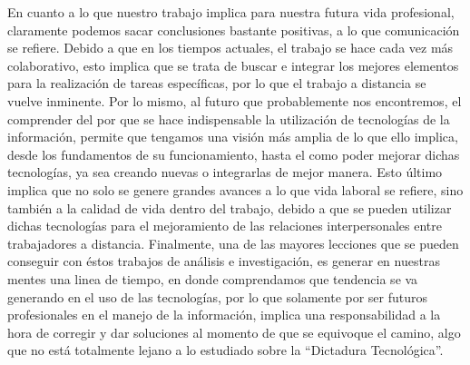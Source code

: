 En cuanto a lo que nuestro trabajo implica para nuestra futura vida profesional, 
claramente podemos sacar conclusiones bastante positivas, a lo que comunicación
se refiere. Debido a que en los tiempos actuales, el trabajo se hace cada vez más 
colaborativo, esto implica que se trata de buscar e integrar los mejores elementos
para la realización de tareas específicas, por lo que el trabajo a distancia se vuelve
inminente. Por lo mismo, al futuro que probablemente nos encontremos, el comprender del 
por que se hace indispensable la utilización de tecnologías de la información, permite que
tengamos una visión más amplia de lo que ello implica, desde los fundamentos de su funcionamiento, hasta
el como poder mejorar dichas tecnologías, ya sea creando nuevas o integrarlas de mejor manera. Esto último
implica que no solo se genere grandes avances a lo que vida laboral se refiere, sino también a la calidad de 
vida dentro del trabajo, debido a que se pueden utilizar dichas tecnologías para el mejoramiento de las relaciones
interpersonales entre trabajadores a distancia. Finalmente, una de las mayores lecciones que se pueden conseguir con
éstos trabajos de análisis e investigación, es generar en nuestras mentes una linea de tiempo, en donde comprendamos que
tendencia se va generando en el uso de las tecnologías, por lo que solamente por ser futuros profesionales en el manejo 
de la información, implica una responsabilidad a la hora de corregir y dar soluciones al momento de que se equivoque el
camino, algo que no está totalmente lejano a lo estudiado sobre la ``Dictadura Tecnológica''.
